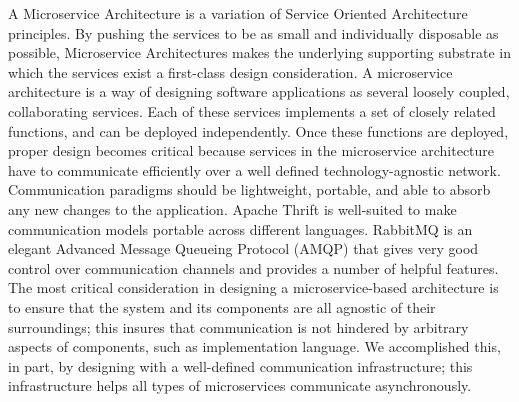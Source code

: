 \documentclass[review]{elsarticle}
\begin{document}
A Microservice Architecture is a variation of Service Oriented Architecture principles. By pushing the services to be as small and individually disposable as possible, Microservice Architectures makes the underlying supporting substrate in which the services exist a first-class design consideration. A microservice architecture is a way of designing software applications as several loosely coupled, collaborating services. Each of these services implements a set of closely related functions, and can be deployed independently. Once these functions are deployed, proper design becomes critical because services in the microservice architecture have to communicate efficiently over a well defined technology-agnostic network. Communication paradigms should be lightweight, portable, and able to absorb any new changes to the application. Apache Thrift is well-suited to make  communication models portable across different languages. RabbitMQ \cite{rabbitMQ} is an elegant Advanced Message Queueing Protocol (AMQP) that gives very good control over communication channels and provides a number of helpful features. The most critical consideration in designing a microservice-based architecture is to ensure that the system and its components are all agnostic of their surroundings; this insures that communication is not hindered by arbitrary aspects of components, such as implementation language. We accomplished this, in part, by designing with a well-defined communication infrastructure; this infrastructure helps all types of microservices communicate asynchronously.
\end{document}
